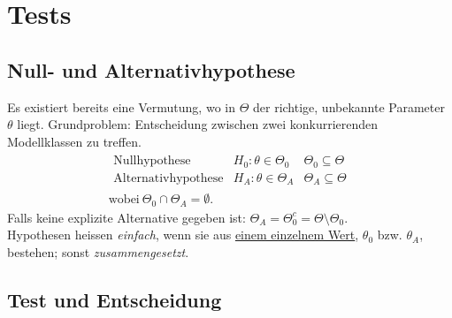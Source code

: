 \section*{Tests}%
\label{sec:tests}

\subsection*{Null- und Alternativhypothese}%
\label{sub:null_und_alternativhypothese}

Es existiert bereits eine Vermutung, wo in $\Theta$ der richtige, unbekannte Parameter $\theta$ liegt. Grundproblem:
Entscheidung zwischen zwei konkurrierenden Modellklassen zu treffen.
\begin{gather*}
	\begin{array}{rcc}
		\text{Nullhypothese} & H_0 : \theta \in \Theta_0 & \Theta_0 \subseteq \Theta \\
		\text{Alternativhypothese} & H_A : \theta \in \Theta_A & \Theta_A \subseteq \Theta
	\end{array}\\
	\text{wobei} ~ \Theta_0 \cap \Theta_A = \emptyset.
\end{gather*}
Falls keine explizite Alternative gegeben ist: $\Theta_A = \Theta_0^c = \Theta \setminus \Theta_0$.\\
Hypothesen heissen \emph{einfach}, wenn sie aus \underline{einem einzelnem Wert}, $\theta_0$ bzw. $\theta_A$,
bestehen; sonst \emph{zusammengesetzt}.

\subsection*{Test und Entscheidung}%
\label{sub:test_und_entscheidung}

